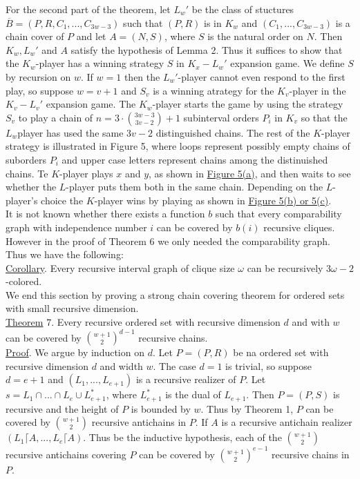 \documentclass[twoside]{article}
\begin{document}
For the second part of the theorem, let $L_w'$ be the class of stuctures
$\overline{B} = (P,R,C_1,...,C_{3w-3})$ such that $(P,R)$ is in $K_w$ and 
$(C_1,...,C_{3w-3})$ is a chain cover of $P$ and let $A=(N,S)$, where $S$ 
is the natural order on $N$. Then $K_w,L_w'$ and $A$ satisfy the
hypothesis of Lemma 2. Thus it suffices to show that the $K_w$-player has
a winning strategy $S$ in $K_x-L_w'$ expansion game.
%
%
We define $S$ by recursion on $w$. If $w=1$ then the $L_w'$-player cannot
even respond to the first play, so suppose $w=v+1$ and $S_v$ is a winning atrategy
for the $K_v$-player in the $K_v-L_v'$ expansion game. The $K_w$-player starts
the game by using the strategy $S_v$ to play a chain of 
$n = 3 \cdot {{3w-3} \choose {3v-2}} +1$ subinterval orders $P_i$ in $K_v$ so that
the $L_w$player has used the same $3v-2$ distinguished chains. The rest of the $K$-player
strategy is illustrated in  Figure 5, where loops represent possibly empty chains of
suborders $P_i$ and upper case letters represent chains among the distinuished chains.
Te $K$-player plays $x$ and $y$, as shown in \underline{Figure 5(a)}, and then waits
to see whether the $L$-player puts them both in the same chain. Depending on the 
$L$-player's choice the $K$-player wins by playing as shown in
\underline{Figure 5(b) or 5(c)}.\\

It is not known whether there exists a function $b$ such that every comparability
graph with independence number $i$ can be covered by $b(i)$ recursive cliques.
However in the proof of Theorem 6 we only needed the comparability graph.
Thus we have the following:\\
\newline
\underline{Corollary}. Every recursive interval graph of clique size $\omega$ can
be recursively $3\omega -2$-colored.\\
\newline
We end this section by proving a strong chain covering theorem for ordered sets with small 
recursive dimension.\\
\newline
\underline{Theorem} 7.  \cite{KiersteadMcNultyTrotter84} Every recursive
ordered set with recursive dimension $d$ and with $w$ can be covered by 
${{w+1} \choose 2}^{d-1}$ recursive chains.\\
\newline
\underline{Proof}. We argue by induction on $d$. Let $P = (P,R)$ be na ordered set 
with recursive dimension $d$ and width $w$. The case $d=1$ is trivial, so suppose
$d=e+1$ and $(L_1,...,L_{e+1})$ is a recursive realizer of $P$. Let
$s=L_1 \cap ... \cap L_e\cup L_{e+1}^*$, where $L_{e+1}^*$ is the dual of $L_{e+1}$.
Then $P=(P,S)$ is recursive and the height of $P$ is bounded by $w$. Thus by Theorem 1, $P$
can be covered by ${w+1} \choose 2$ recursive antichains in $P$. If $A$ is a recursive antichain
realizer $(L_1 \lceil A,...,L_e \lceil A)$. Thus be the inductive hypothesis, each of the 
${w+1 \choose 2}$ recursive antichains covering $P$ can be covered by ${{w+1} \choose 2}^{e-1}$
recursive chains in $P$.\\
\end{document}

